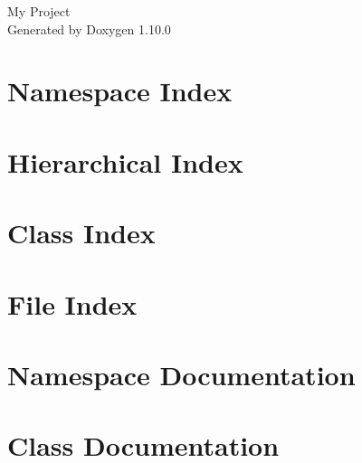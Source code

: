 \documentclass[twoside]{book}
\newcommand{\+}{\discretionary{\mbox{\scriptsize$\hookleftarrow$}}{}{}}
\newcommand{\clearemptydoublepage}{%
    \newpage{\pagestyle{empty}\cleardoublepage}%
  }
\begin{document}
  \raggedbottom
    \hypersetup{pageanchor=false,
                bookmarksnumbered=true,
                pdfencoding=unicode
               }
  \begin{titlepage}
  \vspace*{7cm}
  \begin{center}%
  {\Large My Project}\\
  \vspace*{1cm}
  {\large Generated by Doxygen 1.10.0}\\
  \end{center}
  \end{titlepage}
  \clearemptydoublepage
  \tableofcontents
  \clearemptydoublepage
  \hypersetup{pageanchor=true}
\chapter{Namespace Index}

\chapter{Hierarchical Index}

\chapter{Class Index}

\chapter{File Index}

\chapter{Namespace Documentation}



\chapter{Class Documentation}


















\end{document}
